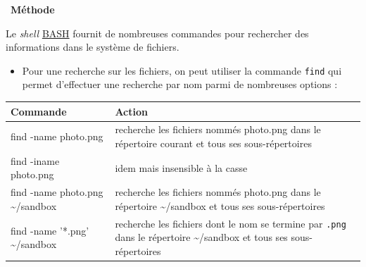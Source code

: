 \documentclass[
  11pt,
]{article}
\providecommand{\tightlist}{%
  \setlength{\itemsep}{0pt}\setlength{\parskip}{0pt}}
\newenvironment{methode}[1]
{\par \medskip    \noindent  
 \begin {bclogo}[arrondi =0.1,logo=\bcoutil, marge=4,noborder = true] {~\textbf{Méthode}   {\itshape #1} }  \par}
{
\end{bclogo}
 \par \bigskip }
\begin{document}
\begin{methode}{}

Le \emph{shell}
\href{https://fr.wikipedia.org/wiki/Bourne-Again_shell}{BASH} fournit de
nombreuses commandes pour rechercher des informations dans le système de
fichiers.

\begin{itemize}
\tightlist
\item
  Pour une recherche sur les fichiers, on peut utiliser la commande
  \texttt{find} qui permet d'effectuer une recherche par nom parmi de
  nombreuses options :
\end{itemize}

\begin{longtable}[]{@{}ll@{}}
\toprule
\begin{minipage}[b]{0.23\columnwidth}\raggedright
Commande\strut
\end{minipage} & \begin{minipage}[b]{0.71\columnwidth}\raggedright
Action\strut
\end{minipage}\tabularnewline
\midrule
\endhead
\begin{minipage}[t]{0.23\columnwidth}\raggedright
find -name photo.png\strut
\end{minipage} & \begin{minipage}[t]{0.71\columnwidth}\raggedright
recherche les fichiers nommés photo.png dans le répertoire courant et
tous ses sous-répertoires\strut
\end{minipage}\tabularnewline
\begin{minipage}[t]{0.23\columnwidth}\raggedright
find -iname photo.png\strut
\end{minipage} & \begin{minipage}[t]{0.71\columnwidth}\raggedright
idem mais insensible à la casse\strut
\end{minipage}\tabularnewline
\begin{minipage}[t]{0.23\columnwidth}\raggedright
find -name photo.png \textasciitilde{}/sandbox\strut
\end{minipage} & \begin{minipage}[t]{0.71\columnwidth}\raggedright
recherche les fichiers nommés photo.png dans le répertoire
\textasciitilde{}/sandbox et tous ses sous-répertoires\strut
\end{minipage}\tabularnewline
\begin{minipage}[t]{0.23\columnwidth}\raggedright
find -name '*.png' \textasciitilde{}/sandbox\strut
\end{minipage} & \begin{minipage}[t]{0.71\columnwidth}\raggedright
recherche les fichiers dont le nom se termine par \texttt{.png} dans le
répertoire \textasciitilde{}/sandbox et tous ses sous-répertoires\strut
\end{minipage}\tabularnewline
\bottomrule
\end{longtable}


\end{methode}
\end{document}
